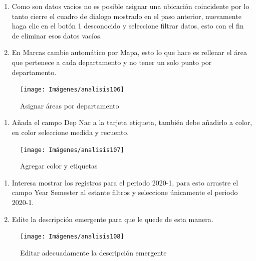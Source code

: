 \documentclass[
]{book}
\providecommand{\tightlist}{%
  \setlength{\itemsep}{0pt}\setlength{\parskip}{0pt}}
\begin{document}
\begin{enumerate}
\def\labelenumi{\arabic{enumi}.}
\setcounter{enumi}{2}
\item
  Como son datos vacíos no es posible asignar una ubicación coincidente por lo tanto cierre el cuadro de dialogo mostrado en el paso anterior, nuevamente haga clic en el botón 1 desconocido y seleccione filtrar datos, esto con el fin de eliminar esos datos vacíos.
\item
  En Marcas cambie automático por Mapa, esto lo que hace es rellenar el área que pertenece a cada departamento y no tener un solo punto por departamento.
\end{enumerate}

\begin{figure}

{\centering \texttt{[image: Imágenes/analisis106]} 

}

\caption{Asignar áreas por departamento}\label{fig:paso4mapeo-fig}
\end{figure}

\begin{enumerate}
\def\labelenumi{\arabic{enumi}.}
\setcounter{enumi}{4}
\tightlist
\item
  Añada el campo Dep Nac a la tarjeta etiqueta, también debe añadirlo a color, en color seleccione medida y recuento.
\end{enumerate}

\begin{figure}

{\centering \texttt{[image: Imágenes/analisis107]} 

}

\caption{Agregar color y etiquetas}\label{fig:paso5mapeo-fig}
\end{figure}

\begin{enumerate}
\def\labelenumi{\arabic{enumi}.}
\setcounter{enumi}{5}
\item
  Interesa mostrar los registros para el periodo 2020-1, para esto arrastre el campo Year Semester al estante filtros y seleccione únicamente el periodo 2020-1.
\item
  Edite la descripción emergente para que le quede de esta manera.
\end{enumerate}

\begin{figure}

{\centering \texttt{[image: Imágenes/analisis108]} 

}

\caption{Editar adecuadamente la descripción emergente}\label{fig:paso7mapeo-fig}
\end{figure}
\end{document}
